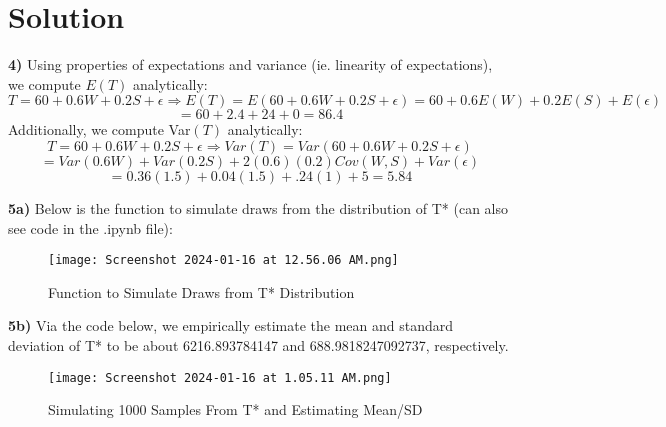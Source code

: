 \documentclass{harvardml}
\theoremstyle{definition}
\theoremstyle{plain}
\newenvironment{solution}
  {\color{blue}\section*{Solution}}
{}
\begin{document}
\begin{solution}
 \textbf{4) } Using properties of expectations and variance (ie. linearity of expectations), we compute $E(T)$ analytically:
 $$
 T = 60 + 0.6W + 0.2S + \epsilon \Rightarrow E(T) = E(60 + 0.6W + 0.2S + \epsilon) = 60 + 0.6E(W) + 0.2E(S) + E(\epsilon)
 $$
 $$
 = 60 + 2.4 + 24 + 0 = 86.4
 $$
 Additionally, we compute Var$(T)$ analytically:
 $$
T = 60 + 0.6W + 0.2S + \epsilon \Rightarrow Var(T) = Var(60 + 0.6W + 0.2S + \epsilon)
$$
$$
= Var(0.6W) + Var(0.2S) + 2(0.6)(0.2)Cov(W, S) + Var(\epsilon) 
$$
$$
= 0.36(1.5) + 0.04(1.5) + .24(1) + 5 = 5.84
$$

\textbf{5a) } Below is the function to simulate draws from the distribution of T* (can also see code in the .ipynb file):

\begin{figure}[H]
    \centering
    \texttt{[image: Screenshot 2024-01-16 at 12.56.06 AM.png]}
    \caption{Function to Simulate Draws from T* Distribution}
    \label{fig:enter-label}
\end{figure}


\textbf{5b) } Via the code below, we empirically estimate the mean and standard deviation of T* to be about 6216.893784147 and 688.9818247092737, respectively.

\begin{figure}[H]
    \centering
    \texttt{[image: Screenshot 2024-01-16 at 1.05.11 AM.png]}
    \caption{Simulating 1000 Samples From T* and Estimating Mean/SD}
    \label{fig:enter-label}
\end{figure}

\end{solution} 
\end{document}
